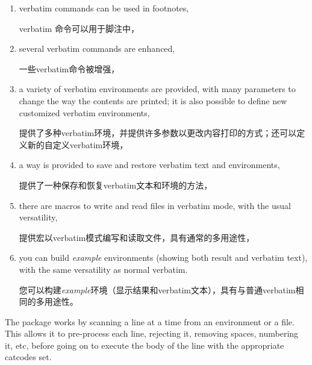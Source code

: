 \documentclass[twoside]{article}
\begin{document}
\begin{enumerate}
\item verbatim commands can be used in footnotes,\par
verbatim 命令可以用于脚注中，

\item several verbatim commands are enhanced, {\par}
一些verbatim命令被增强，

\item a variety of verbatim environments are provided, with many
parameters to change the way the contents are printed; it is also possible
to define new customized verbatim environments,{\par}
提供了多种verbatim环境，并提供许多参数以更改内容打印的方式；还可以定义新的自定义verbatim环境，

\item a way is provided to save and restore verbatim text and environments,{\par}
提供了一种保存和恢复verbatim文本和环境的方法，

\item there are macros to write and read files in verbatim mode, with the
usual versatility,{\par}
提供宏以verbatim模式编写和读取文件，具有通常的多用途性，

\item you can build \emph{example} environments (showing both result and
verbatim text), with the same versatility as normal verbatim.{\par}
您可以构建\emph{example}环境（显示结果和verbatim文本），具有与普通verbatim相同的多用途性。
\end{enumerate}

The package works by scanning a line at a time from an environment or a
file. This allows it to pre-process each line, rejecting it, removing
spaces, numbering it, etc, before going on to execute the body of the line
with the appropriate catcodes set.
\end{document}
